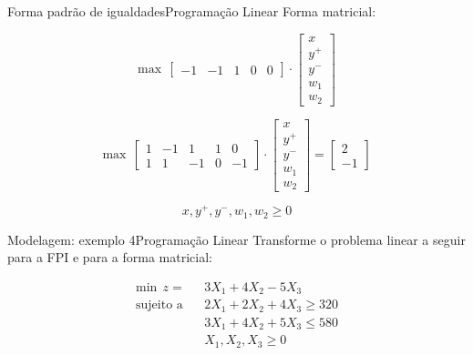 \documentclass[t]{beamer}
\begin{document}
\begin{ftst}{Forma padrão de igualdades}{Programação Linear}
Forma matricial:

\begin{equation*}
    \text{max} \ \ \begin{bmatrix}
-1 & -1 & 1 & 0 & 0
\end{bmatrix} \cdot \begin{bmatrix}
x \\ 
y^+\\ 
y^-\\ 
w_1\\ 
w_2
\end{bmatrix} 
\end{equation*}

\begin{equation*}
\text{max} \ \ \begin{bmatrix}
1 & -1 & 1 & 1 & 0 \\
1 & 1 & -1 & 0 & -1 
\end{bmatrix} \cdot \begin{bmatrix}
x \\ 
y^+\\ 
y^-\\ 
w_1\\ 
w_2
\end{bmatrix} = \begin{bmatrix}
2\\ 
-1
\end{bmatrix}
\end{equation*}

\begin{equation*}
    x, y^+, y^-, w_1, w_2 \geq 0
\end{equation*}

\end{ftst}



\begin{ftst}{Modelagem: exemplo 4}{Programação Linear}
Transforme o problema linear a seguir para a FPI e para a forma matricial:

\begin{align*}
        \text{min} \ \ z = \ \ \ & 3X_1 + 4X_2 - 5X_3 \\ 
        \text{sujeito a} \ \ \  & 2X_1 + 2X_2 + 4X_3 \geq 320 \\
        \text{} \ \ \ & 3X_1 + 4X_2 + 5X_3 \leq 580 \\
        \text{} \ \ \ & X_1, X_2, X_3 \geq 0
\end{align*}


\end{ftst}
\end{document}
